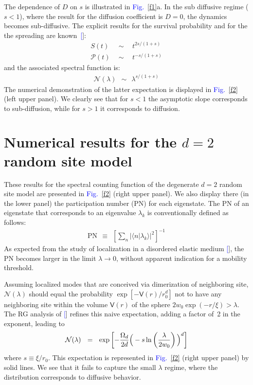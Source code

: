 \documentclass[aps,prb,floats,floatfix,twocolumn]{revtex4}
\newcommand{\mylabel}[1]{\label{#1}}
\newcommand{\beq}{\begin{eqnarray}}
\newcommand{\eeq}{\end{eqnarray}}
\newcommand{\be}[1]{\begin{eqnarray}\ifthenelse{#1=-1}
{\nonumber}{\ifthenelse{#1=0}{}{\mylabel{e#1}}}}
\newcommand{\Fig}[1]{\textcolor{blue}{Fig.}\!\!~\ref{#1}}
\renewcommand{\cite}[1]{\textcolor{blue}{[\onlinecite{#1}}]} %
\begin{document}
The dependence of $D$ on $s$ is illustrated in \Fig{f1}a.
In the sub diffusive regime (${s<1}$),  
where the result for the diffusion coefficient is ${D=0}$, 
the dynamics becomes sub-diffusive.  
The explicit results for the survival probability 
and for the the spreading are known~\cite{alexander}: 
%
\beq
S(t) \ \ &\sim& \ \ t^{2s/(1+s)}   \\ 
\mathcal{P}(t) \ \ &\sim& \ \ t^{-s/(1+s)}
\eeq
%
and the associated spectral function is:
%
\beq
\mathcal{N}(\lambda) \ \ \sim \ \ \lambda^{s/(1+s)}
\eeq
%
The numerical demonstration of the latter expectation is displayed 
in \Fig{f2} (left upper panel).
We clearly see that for $s<1$ the asymptotic slope corresponds 
to sub-diffusion, while for ${s>1}$ it corresponds to diffusion. 



\section{Numerical results for the $d{=}2$ random site model}

These results for the spectral counting function
of the degenerate $d{=}2$ random site model are presented  
in \Fig{f2} (right upper panel). 
We also display there (in the lower panel) 
the participation number (PN) for each eigenstate. 
The PN of an eigenstate that corresponds to 
an eigenvalue $\lambda_k$ is conventionally 
defined as follows:
%
\beq 
\text{PN} \ \ \equiv \ \ \left[ \sum_n |\langle n| \lambda_k \rangle|^2 \right]^{-1}
\eeq
%
As expected from the study of localization
in a disordered elastic medium \cite{loc}, 
the PN becomes larger in the limit ${\lambda\rightarrow 0}$, 
without apparent indication for a mobility threshold.


Assuming localized modes that are conceived via dimerization of 
neighboring site, $\mathcal{N}(\lambda)$ should equal 
the probability $\exp[-\mathsf{V}(r)/r_0^d]$ 
not to have any neighboring site within 
the volume $\mathsf{V}(r)$ of the sphere ${2w_0 \exp(-r/\xi) > \lambda}$. 
The RG analysis of \cite{amir} refines this naive 
expectation, adding a factor of~2 in the exponent, leading to 
%
\be{23}
\mathcal{N}(\lambda) \ \ = \ \ \exp\left[ -\frac{\Omega_d}{2d} \Big(-s \ln\left(\frac{\lambda}{2w_0}\right)\Big)^d \right]
\eeq
%
where $s \equiv \xi/r_0$. 
This expectation is represented in \Fig{f2} (right upper panel) 
by solid lines.  We see that it fails to capture the small $\lambda$ regime, 
where the distribution corresponds to diffusive behavior. 
\end{document}
